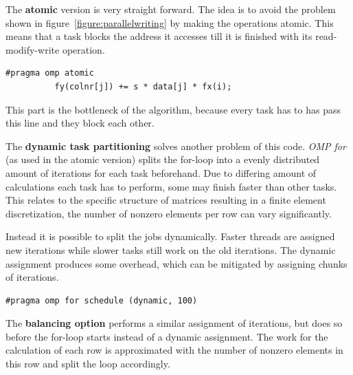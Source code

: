 \documentclass[a4paper,11pt]{scrartcl}
\begin{document}
The \textbf{atomic} version is very straight forward. The idea is to avoid the
problem shown in figure~\ref{figure:parallelwriting} by making the operations
atomic. This means that a task blocks the address it accesses till it is
finished with its read-modify-write operation.

\begin{lstlisting}
#pragma omp atomic
          fy(colnr[j]) += s * data[j] * fx(i);
\end{lstlisting}

This part is the bottleneck of the algorithm, because every task has to has
pass this line and they block each other.

The \textbf{dynamic task partitioning} solves another problem of this code.
{\em OMP for} (as used in the atomic version) splits the for-loop into a
evenly distributed amount of iterations for each task beforehand. Due to
differing amount of calculations each task has to perform, some may finish
faster than other tasks. This relates to the specific structure of matrices
resulting in a finite element discretization, the number of nonzero elements
per row can vary significantly.

Instead it is possible to split the jobs dynamically. Faster threads are
assigned new iterations while slower tasks still work on the old iterations.
The dynamic assignment produces some overhead, which can be mitigated by
assigning chunks of iterations.

\begin{lstlisting}
#pragma omp for schedule (dynamic, 100)
\end{lstlisting}

The \textbf{balancing option} performs a similar assignment of iterations, but
does so before the for-loop starts instead of a dynamic assignment. The work
for the calculation of each row is approximated with the number of nonzero
elements in this row and split the loop accordingly.
\end{document}
